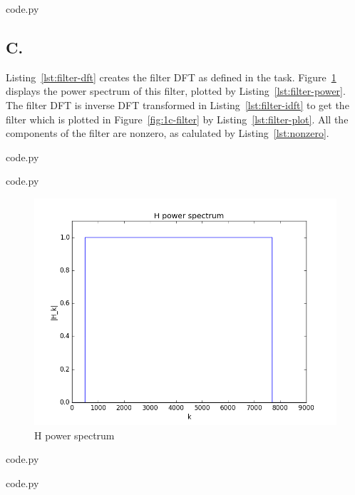 
  {code.py}

\subsection*{C.}

Listing~\ref{lst:filter-dft} creates the filter DFT as defined in the task.
Figure~\ref{fig:1c-power} displays the power spectrum of this filter, plotted by Listing~\ref{lst:filter-power}.
The filter DFT is inverse DFT transformed in Listing~\ref{lst:filter-idft} to get the filter which is plotted in Figure~\ref{fig:1c-filter} by Listing~\ref{lst:filter-plot}.
All the components of the filter are nonzero, as calulated by Listing~\ref{lst:nonzero}.


  {code.py}


  {code.py}

\begin{figure}[H]
  \includegraphics[width=\textwidth]{1c_power}
  \caption{H power spectrum}
  \label{fig:1c-power}
\end{figure}


  {code.py}


  {code.py}

